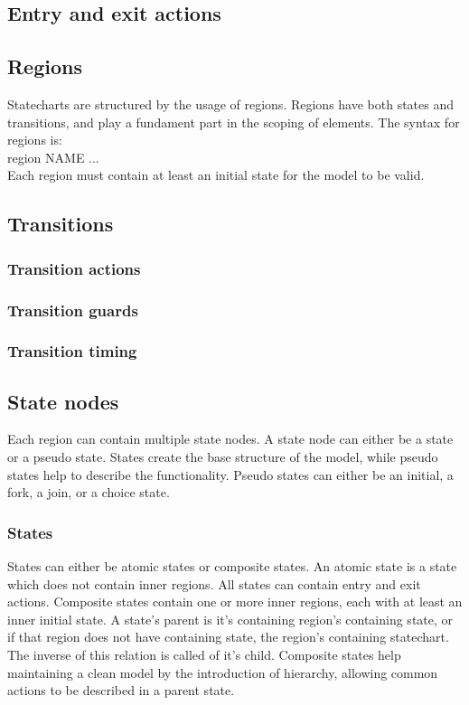 {  \subsection{Entry and exit actions}
  \subsection{Regions}
Statecharts are structured by the usage of regions. Regions have both states and transitions, and play a fundament part in the scoping of elements. The syntax for regions is: \\region NAME { ... }\\ Each region must contain at least an initial state for the model to be valid.
  \subsection{Transitions}

    \subsubsection{Transition actions}
    \subsubsection{Transition guards}
    \subsubsection{Transition timing}
  \subsection{State nodes}
Each region can contain multiple state nodes. A state node can either be a state or a pseudo state. States create the base structure of the model, while pseudo states help to describe the functionality. Pseudo states can either be an initial, a fork, a join, or a choice state.
    \subsubsection{States}
States can either be atomic states or composite states. An atomic state is a state which does not contain inner regions. All states can contain entry and exit actions. Composite states contain one or more inner regions, each with at least an inner initial state. A state's parent is it's containing region's containing state, or if that region does not have containing state, the region's containing statechart. The inverse of this relation is called of it's child. Composite states help maintaining a clean model by the introduction of hierarchy, allowing common actions to be described in a parent state.
}
